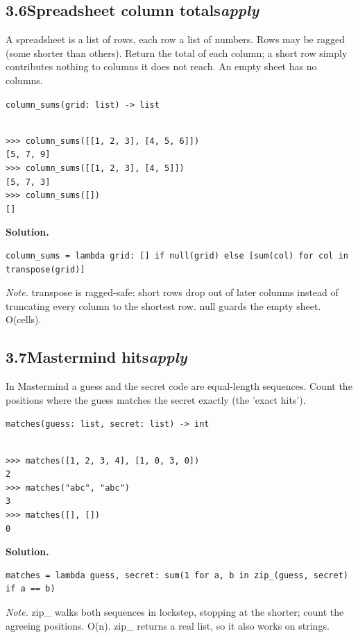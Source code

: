 \documentclass[10pt,letterpaper]{book}
\begin{document}
\subsection*{3.6\quad Spreadsheet column totals\hfill\textnormal{\textit{apply}}}
A spreadsheet is a list of rows, each row a list of numbers. Rows may be ragged (some shorter than others). Return the total of each column; a short row simply contributes nothing to columns it does not reach. An empty sheet has no columns.

\noindent\texttt{column\_sums(grid: list) -> list}
\begin{lstlisting}[style=ex]

>>> column_sums([[1, 2, 3], [4, 5, 6]])
[5, 7, 9]
>>> column_sums([[1, 2, 3], [4, 5]])
[5, 7, 3]
>>> column_sums([])
[]

\end{lstlisting}
\noindent\textbf{Solution.}
\begin{lstlisting}[style=code]
column_sums = lambda grid: [] if null(grid) else [sum(col) for col in transpose(grid)]
\end{lstlisting}
\noindent\textit{Note.} transpose is ragged-safe: short rows drop out of later columns instead of truncating every column to the shortest row. null guards the empty sheet. O(cells).

\subsection*{3.7\quad Mastermind hits\hfill\textnormal{\textit{apply}}}
In Mastermind a guess and the secret code are equal-length sequences. Count the positions where the guess matches the secret exactly (the 'exact hits').

\noindent\texttt{matches(guess: list, secret: list) -> int}
\begin{lstlisting}[style=ex]

>>> matches([1, 2, 3, 4], [1, 0, 3, 0])
2
>>> matches("abc", "abc")
3
>>> matches([], [])
0

\end{lstlisting}
\noindent\textbf{Solution.}
\begin{lstlisting}[style=code]
matches = lambda guess, secret: sum(1 for a, b in zip_(guess, secret) if a == b)
\end{lstlisting}
\noindent\textit{Note.} zip\_ walks both sequences in lockstep, stopping at the shorter; count the agreeing positions. O(n). zip\_ returns a real list, so it also works on strings.
\end{document}
